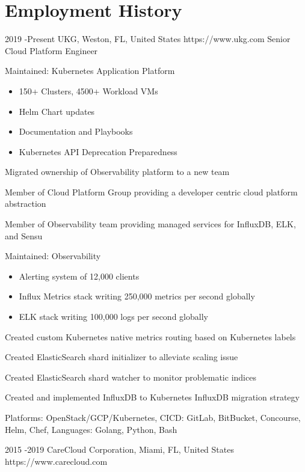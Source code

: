 \documentclass[10pt]{article} %
\begin{document}
\section{Employment History}
\job
{2019 -}{Present}
{UKG, Weston, FL, United States}
{https://www.ukg.com}
{Senior Cloud Platform Engineer}
{\begin{itemize-noindent}
\item{Maintained: Kubernetes Application Platform}
  \begin{itemize}
    \item{150+ Clusters, 4500+ Workload VMs}
    \item{Helm Chart updates}
    \item{Documentation and Playbooks}
    \item{Kubernetes API Deprecation Preparedness}
  \end{itemize}
\item{Migrated ownership of Observability platform to a new team}
\item{Member of Cloud Platform Group providing a developer centric cloud platform abstraction}
\item{Member of Observability team providing managed services for InfluxDB, ELK, and Sensu}
\item{Maintained: Observability}
  \begin{itemize}
    \item{Alerting system of 12,000 clients}
    \item{Influx Metrics stack writing 250,000 metrics per second globally}
    \item{ELK stack writing 100,000 logs per second globally}
  \end{itemize}
\item{Created custom Kubernetes native metrics routing based on Kubernetes labels}
\item{Created ElasticSearch shard initializer to alleviate scaling issue}
\item{Created ElasticSearch shard watcher to monitor problematic indices}
\item{Created and implemented InfluxDB to Kubernetes InfluxDB migration strategy}
\item{Platforms: OpenStack/GCP/Kubernetes, CICD: GitLab, BitBucket, Concourse, Helm, Chef, Languages: Golang, Python, Bash}
\end{itemize-noindent}}
\job
{2015 -}{2019}
{CareCloud Corporation, Miami, FL, United States}
{https://www.carecloud.com}
\end{document}
